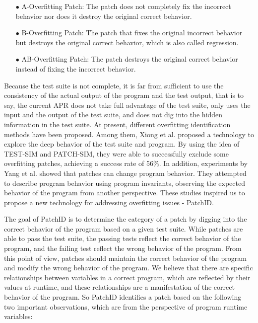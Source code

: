 \begin{itemize}
	\item[$\bullet$] A-Overfitting Patch: The patch does not completely fix the incorrect behavior nor does it destroy the original correct behavior.
	\item[$\bullet$] B-Overfitting Patch: The patch that fixes the original incorrect behavior but destroys the original correct behavior, which is also called regression.
	\item[$\bullet$] AB-Overfitting Patch: The patch destroys the original correct behavior instead of fixing the incorrect behavior.
\end{itemize}

Because the test suite is not complete, it is far from sufficient to  use the consistency of the actual output of the program and the test output, that is to say, the current APR does not take full advantage of the test suite, only uses the input and the output of the test suite, and does not dig into the hidden information in the test suite. At present, different overfitting identification methods have been proposed. Among them, Xiong et al. \cite{ref6} proposed a technology to explore the deep behavior of the test suite and program. By using the idea of TEST-SIM and PATCH-SIM, they were able to successfully exclude some overfitting patches, achieving a success rate of 56$\%$. In addition, experiments by Yang et al. \cite{ref7} showed that patches can change program behavior. They attempted to describe program behavior using program invariants, observing the expected behavior of the program from another perspective. These studies inspired us to propose a new technology for addressing overfitting issues - PatchID.

The goal of PatchID is to determine the category of a patch by digging into the correct behavior of the program based on a given test suite. While patches are able to pass the test suite, the passing tests reflect the correct behavior of the program, and the failing test reflect the wrong behavior of the program. From this point of view, patches should maintain the correct behavior of the program and modify the wrong behavior of the program. We believe that there are specific relationships between variables in a correct program, which are reflected by their values at runtime, and these relationships are a manifestation of the correct behavior of the program. So PatchID identifies a patch based on the following two important observations, which are from the perspective of program runtime variables:

